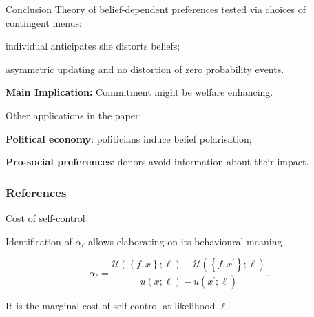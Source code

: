 \documentclass[usenames,dvipsnames,aspectratio=169,11pt]{beamer}
\begin{document}
\begin{frame}{Conclusion}
	Theory of belief-dependent preferences tested via choices of contingent menus:
	\vfill

	\begin{wideitemize}
		\item individual anticipates she distorts beliefs;
		\item asymmetric updating and no distortion of zero probability events.
	\end{wideitemize}

	\vfill

	\textbf{Main Implication:} Commitment might be welfare enhancing.

	\vfill

	Other applications in the paper:

	\vfill

	\begin{wideitemize}
		\item \textbf{Political economy}: politicians induce belief polarisation;
		\item \textbf{Pro-social preferences}: donors avoid information about their impact.
	\end{wideitemize}

\end{frame}

\begin{frame}

	\frametitle{References}

	
	


\end{frame}

\appendix

\begin{frame}{Cost of self-control}\label{alpha}

	Identification of \( \alpha_{\ell} \) allows elaborating on its behavioural meaning

	\vfill

	\[
		\alpha_{\ell} = \frac{\mathcal{U} \left( \left\{f, x \right\}; \ell \right) - \mathcal{U} \left( \left\{f, x^{\prime} \right\}; \ell \right) }{u \left( x ; \ell \right) - u \left( x^{\prime} ; \ell \right)} .
	\]

	\vfill

	It is the marginal cost of self-control at likelihood \( \ell \). \hyperlink{fullmodel}{}

\end{frame}
\end{document}
